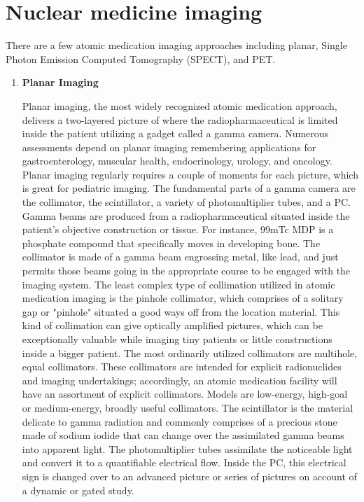 \documentclass[12pt]{article}
\begin{document}
\section{Nuclear medicine imaging}
There are a few atomic medication imaging approaches including planar, Single Photon Emission Computed Tomography (SPECT), and PET.
\begin{enumerate}
\item \textbf{Planar Imaging} \par 
Planar imaging, the most widely recognized atomic medication approach, delivers a two-layered picture of where the radiopharmaceutical is limited inside the patient utilizing a gadget called a gamma camera. Numerous assessments depend on planar imaging remembering applications for gastroenterology, muscular health, endocrinology, urology, and oncology. Planar imaging regularly requires a couple of moments for each picture, which is great for pediatric imaging.
The fundamental parts of a gamma camera are the collimator, the scintillator, a variety of photomultiplier tubes, and a PC. Gamma beams are produced from a radiopharmaceutical situated inside the patient's objective construction or tissue. For instance, 99mTc MDP is a phosphate compound that specifically moves in developing bone. The collimator is made of a gamma beam engrossing metal, like lead, and just permits those beams going in the appropriate course to be engaged with the imaging system. The least complex type of collimation utilized in atomic medication imaging is the pinhole collimator, which comprises of a solitary gap or "pinhole" situated a good ways off from the location material. This kind of collimation can give optically amplified pictures, which can be exceptionally valuable while imaging tiny patients or little constructions inside a bigger patient.
The most ordinarily utilized collimators are multihole, equal collimators. These collimators are intended for explicit radionuclides and imaging undertakings; accordingly, an atomic medication facility will have an assortment of explicit collimators. Models are low-energy, high-goal or medium-energy, broadly useful collimators. The scintillator is the material delicate to gamma radiation and commonly comprises of a precious stone made of sodium iodide that can change over the assimilated gamma beams into apparent light. The photomultiplier tubes assimilate the noticeable light and convert it to a quantifiable electrical flow. Inside the PC, this electrical sign is changed over to an advanced picture or series of pictures on account of a dynamic or gated study.


\end{enumerate}
\end{document}
